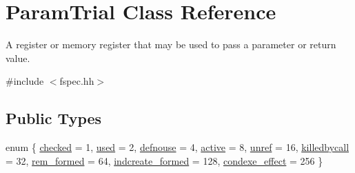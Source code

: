 \hypertarget{class_param_trial}{}\section{Param\+Trial Class Reference}
\label{class_param_trial}


A register or memory register that may be used to pass a parameter or return value.  




{\ttfamily \#include $<$fspec.\+hh$>$}

\subsection*{Public Types}
\begin{DoxyCompactItemize}
\item 
enum \{ \newline
\mbox{\hyperlink{class_param_trial_a716f03faac64ddccab096ba19364ffa2a2c072d9a2e3bc49347559e8f24c31829}{checked}} = 1, 
\mbox{\hyperlink{class_param_trial_a716f03faac64ddccab096ba19364ffa2a279ad7257dfc9d26818a1ad80a54fbe9}{used}} = 2, 
\mbox{\hyperlink{class_param_trial_a716f03faac64ddccab096ba19364ffa2a3798c0aef21d0245d1e9fb23be020d20}{defnouse}} = 4, 
\mbox{\hyperlink{class_param_trial_a716f03faac64ddccab096ba19364ffa2aa197ba7c3d3418cb220e911b24022a07}{active}} = 8, 
\newline
\mbox{\hyperlink{class_param_trial_a716f03faac64ddccab096ba19364ffa2adb2ef4c29bcffea45f89d69b30a31253}{unref}} = 16, 
\mbox{\hyperlink{class_param_trial_a716f03faac64ddccab096ba19364ffa2a7da8fea4839c73b4671fc73fd02e103b}{killedbycall}} = 32, 
\mbox{\hyperlink{class_param_trial_a716f03faac64ddccab096ba19364ffa2aff924d3ea43eb53717814ce587b45a76}{rem\+\_\+formed}} = 64, 
\mbox{\hyperlink{class_param_trial_a716f03faac64ddccab096ba19364ffa2ad3954f5b872e0e9bb1fb5a8b3fb78ac0}{indcreate\+\_\+formed}} = 128, 
\newline
\mbox{\hyperlink{class_param_trial_a716f03faac64ddccab096ba19364ffa2a78f62aca0c665a96ccb34c92e196ca60}{condexe\+\_\+effect}} = 256
 \}
\end{DoxyCompactItemize}
